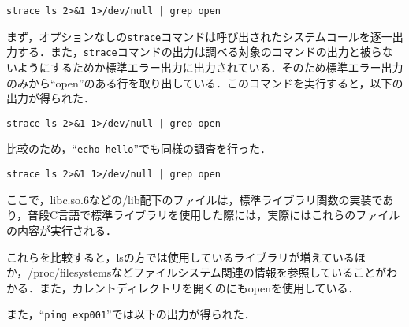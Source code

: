 \documentclass[a4j,10pt,titlepage]{jsarticle}
\begin{document}
\begin{verbatim}
strace ls 2>&1 1>/dev/null | grep open
\end{verbatim}

まず，オプションなしの\verb|strace|コマンドは呼び出されたシステムコールを逐一出力する．また，\verb|strace|コマンドの出力は調べる対象のコマンドの出力と被らないようにするためか標準エラー出力に出力されている．そのため標準エラー出力のみから``open''のある行を取り出している．このコマンドを実行すると，以下の出力が得られた．

\begin{verbatim}
strace ls 2>&1 1>/dev/null | grep open
\end{verbatim}

比較のため，``\verb|echo hello|''でも同様の調査を行った．

\begin{verbatim}
strace ls 2>&1 1>/dev/null | grep open
\end{verbatim}

ここで，libc.so.6などの/lib配下のファイルは，標準ライブラリ関数の実装であり，普段C言語で標準ライブラリを使用した際には，実際にはこれらのファイルの内容が実行される．

これらを比較すると，lsの方では使用しているライブラリが増えているほか，/proc/filesystemsなどファイルシステム関連の情報を参照していることがわかる．また，カレントディレクトリを開くのにもopenを使用している．

また，``\verb|ping exp001|''では以下の出力が得られた．
\end{document}
